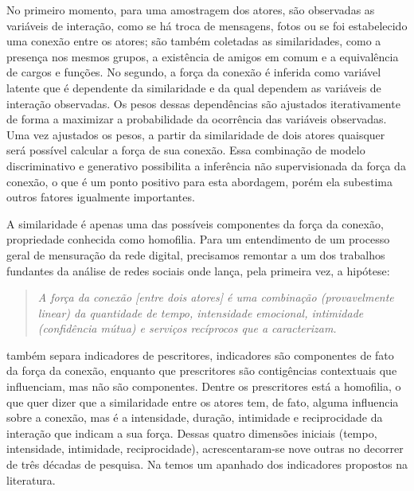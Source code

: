 No primeiro momento, para uma amostragem dos atores, são observadas as variáveis
de interação, como se há troca de mensagens, fotos ou se foi estabelecido uma
conexão entre os atores; são também coletadas as similaridades, como a presença
nos mesmos grupos, a existência de amigos em comum e a equivalência de cargos e
funções. No segundo, a força da conexão é inferida como variável latente que é
dependente da similaridade e da qual dependem as variáveis de interação
observadas. Os pesos dessas dependências são ajustados iterativamente de forma a
maximizar a probabilidade da ocorrência das variáveis observadas. Uma vez
ajustados os pesos, a partir da similaridade de dois atores quaisquer será
possível calcular a força de sua conexão. Essa combinação de modelo discriminativo e
generativo possibilita a inferência não supervisionada da força da conexão, o que
é um ponto positivo para esta abordagem, porém ela subestima outros fatores
igualmente importantes.

A similaridade é apenas uma das possíveis componentes da força da conexão,
propriedade conhecida como homofilia. Para um entendimento de um processo geral
de mensuração da rede digital, precisamos remontar a um dos trabalhos fundantes
da análise de redes sociais onde \citeauthor{Granovetter1973} lança, pela
primeira vez, a hipótese:

	\begin{quote}{\citep{Granovetter1973}}
	\emph{A força da conexão [entre dois atores] é uma combinação
	(provavelmente linear) da quantidade de tempo, intensidade emocional,
	intimidade (confidência mútua) e serviços recíprocos que a
	caracterizam.} 
	\end{quote}

\citeauthor{Granovetter1973} também separa indicadores de pescritores,
indicadores são componentes de fato da força da conexão, enquanto que
prescritores são contigências contextuais que influenciam, mas não são
componentes. Dentre os prescritores está a homofilia, o que quer dizer que a
similaridade entre os atores tem, de fato, alguma influencia sobre a conexão, mas
é a intensidade, duração, intimidade e reciprocidade da interação que indicam a
sua força. Dessas quatro dimensões iniciais (tempo, intensidade, intimidade,
reciprocidade), acrescentaram-se nove outras no decorrer de três décadas de
pesquisa. Na  temos um apanhado dos indicadores propostos na
literatura.

